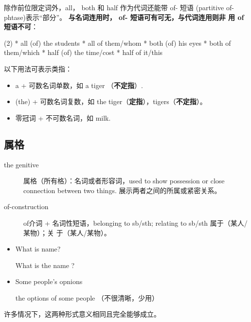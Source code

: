 除作前位限定词外，all， both 和 half 作为代词还能带 of- 短语 (partitive
of-phtase)表示“部分”。 \textbf{与名词连用时， of- 短语可有可无，与代词连用则非
  用 of短语不可}：
\begin{taskitem}(2)
  * all (of) the students
  * all of them/whom
  * both (of) his eyes
  * both of them/which
  * half (of) the time/cost
  * half of it/this
\end{taskitem}

以下用法可表示类指：
\begin{itemize}
\item a + 可数名词单数，如 a tiger （\textbf{不定指}）.
\item (the) + 可数名词复数，如 the tiger（\textbf{定指}），tigers（\textbf{不定指}）。
\item 零冠词 + 不可数名词，如 milk.
\end{itemize}

\subsection{属格}

\begin{description}
\item[the genitive] 属格（所有格）：名词或者形容词，used to show possession or
  close connection between two things. 展示两者之间的所属或紧密关系。
\item[of-construction] of介词 + 名词性短语，belonging to sb/sth; relating to sb/sth 属于（某人/某物）；关
  于（某人/某物）。
\end{description}

\begin{itemize}
\item What is  name?

  What is the name ?

\item Some people's opnions

  the options of some people （不很清晰，少用）
\end{itemize}
许多情况下，这两种形式意义相同且完全能够成立。

